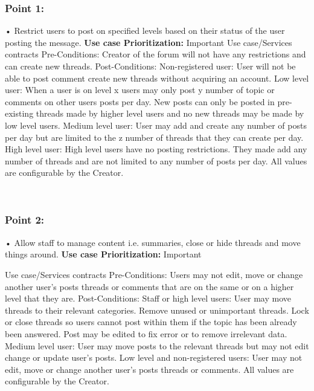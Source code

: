 \documentclass[11pt]{article}
\begin{document}
\subsubsection{Point 1:}
\begin{enumerate}
•	Restrict users to post on specified levels based on their status of the user posting the message.
\newline
\textbf{Use case Prioritization:} Important
\newline
Use case/Services contracts
\newline
Pre-Conditions:
\newline
Creator of the forum will not have any restrictions and can create new threads.
\newline
Post-Conditions:
Non-registered user:
User will not be able to post comment create new threads without acquiring an account.
\newline
Low level user:
When a user is on level x users may only post y number of topic or comments on other users posts per day. New posts can only be posted in pre-existing threads made by higher level users and no new threads may be made by low level users. 
\newline
Medium level user:
User may add and create any number of posts per day but are limited to the z number of threads that they can create per day.
\newline
High level user:
High level users have no posting restrictions. They made add any number of threads and are not limited to any number of posts per day.
 \newline
 All values are configurable by the Creator.
 \newline
 \end{enumerate}
 
\subsubsection{Point 2:}
•	Allow staff to manage content i.e. summaries, close or hide threads and move things around.
\newline
\textbf{Use case Prioritization:} Important
	

Use case/Services contracts
\newline
Pre-Conditions:
\newline
Users may not edit, move or change another user’s posts threads or comments that are on the same or on a higher level that they are.
\newline
Post-Conditions:
\newline
Staff or high level users:
User may move threads to their relevant categories. Remove unused or unimportant threads. Lock or close threads so users cannot post within them if the topic has been already been answered. Post may be edited to fix error or to remove irrelevant data.
\newline
Medium level user:
User may move posts to the relevant threads but may not edit change or update user’s posts.
\newline
Low level and non-registered users:
User may not edit, move or change another user’s posts threads or comments.
\newline
All values are configurable by the Creator.
\newline
 
\end{document}
